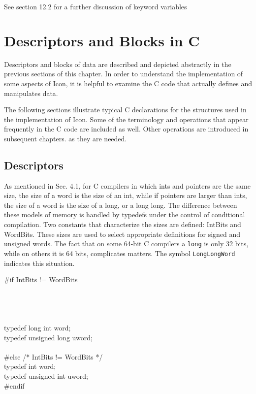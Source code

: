 See section 12.2 for a further discussion of keyword variables

\section{Descriptors and Blocks in C}

Descriptors and blocks of data are described and depicted abstractly
in the previous sections of this chapter. In order to understand the
implementation of some aspects of Icon, it is helpful to examine the C
code that actually defines and manipulates data.

The following sections illustrate typical C declarations for the
structures used in the implementation of Icon. Some of the terminology
and operations that appear frequently in the C code are included as
well. Other operations are introduced in subsequent chapters. as they
are needed.

\subsection{Descriptors}

As mentioned in Sec. 4.1, for C compilers in which ints and pointers
are the same size, the size of a word is the size of an int, while if
pointers are larger than ints, the size of a word is the size of a
long, or a long long. The difference between these models of memory is
handled by typedefs under the control of conditional compilation. Two
constants that characterize the sizes are defined: IntBits and
WordBits. These sizes are used to select appropriate definitions for
signed and unsigned words. The fact that on some 64-bit C compilers a
\texttt{long} is only 32 bits, while on others it is 64 bits,
complicates matters. The symbol \texttt{LongLongWord} indicates this
situation.

\bigskip

\begin{iconcode}
\>\#if IntBits != WordBits\\
\>\\
\>\>\\
\>\>\\
\>\\
\>\>\>typedef long int word;\\
\>\>\>typedef unsigned long uword;\\
\>\\
\>\#else \>\>\>\>\>\>\> /* IntBits != WordBits */ \\
\>typedef int word;\\
\>typedef unsigned int uword;\\
\>\#endif
\end{iconcode}

